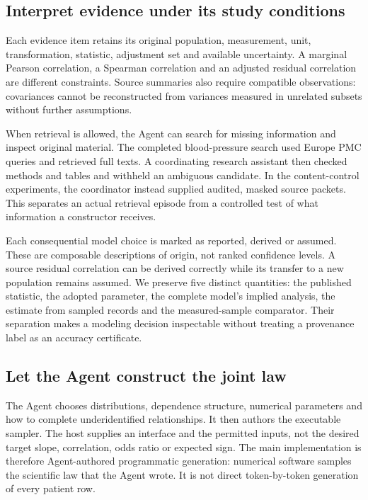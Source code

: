 \documentclass[11pt,letterpaper]{article}
\begin{document}
\subsection{Interpret evidence under its study conditions}

Each evidence item retains its original population, measurement, unit, transformation, statistic, adjustment set and available uncertainty. A marginal Pearson correlation, a Spearman correlation and an adjusted residual correlation are different constraints. Source summaries also require compatible observations: covariances cannot be reconstructed from variances measured in unrelated subsets without further assumptions.


When retrieval is allowed, the Agent can search for missing information and inspect original material. The completed blood-pressure search used Europe PMC queries and retrieved full texts. A coordinating research assistant then checked methods and tables and withheld an ambiguous candidate. In the content-control experiments, the coordinator instead supplied audited, masked source packets. This separates an actual retrieval episode from a controlled test of what information a constructor receives.


Each consequential model choice is marked as reported, derived or assumed. These are composable descriptions of origin, not ranked confidence levels. A source residual correlation can be derived correctly while its transfer to a new population remains assumed. We preserve five distinct quantities: the published statistic, the adopted parameter, the complete model's implied analysis, the estimate from sampled records and the measured-sample comparator. Their separation makes a modeling decision inspectable without treating a provenance label as an accuracy certificate.


\FloatBarrier


\subsection{Let the Agent construct the joint law}

The Agent chooses distributions, dependence structure, numerical parameters and how to complete underidentified relationships. It then authors the executable sampler. The host supplies an interface and the permitted inputs, not the desired target slope, correlation, odds ratio or expected sign. The main implementation is therefore Agent-authored programmatic generation: numerical software samples the scientific law that the Agent wrote. It is not direct token-by-token generation of every patient row.
\end{document}

